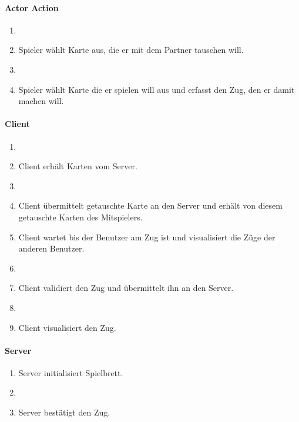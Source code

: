 \documentclass[12pt,halfparskip]{scrartcl}
\begin{document}
\begin{multicols}{3}
\raggedcolumns \centering
\paragraph{Actor Action}
\begin{enumerate}
	\item[] \vspace{3 \lineheight}
	\item[3] Spieler wählt Karte aus, die er mit dem Partner tauschen will.
	\item[] \vspace{11 \lineheight}
	\item[6] Spieler wählt Karte die er spielen will aus und erfasst den Zug, den er damit machen will.
\end{enumerate}
\columnbreak
\paragraph{Client}
\begin{enumerate}
	\item[] \vspace{1 \lineheight}
	\item[2] Client erhält Karten vom Server.
	\item[] \vspace{2 \lineheight}
	\item[4] Client übermittelt getauschte Karte an den Server und erhält von diesem getauschte Karten des Mitspielers.
	\item[5] Client wartet bis der Benutzer am Zug ist und visualisiert die Züge der anderen Benutzer.
	\item[] \vspace{3 \lineheight}
	\item[7] Client validiert den Zug und übermittelt ihn an den Server.
	\item[] \vspace{1 \lineheight}
	\item[9] Client visualisiert den Zug.
\end{enumerate}
\columnbreak
\paragraph{Server}
\begin{enumerate}
	\item[1] Server initialisiert Spielbrett.
	\item[] \vspace{24 \lineheight}
	\item[8] Server bestätigt den Zug.
\end{enumerate}
\end{multicols}
\end{document}
